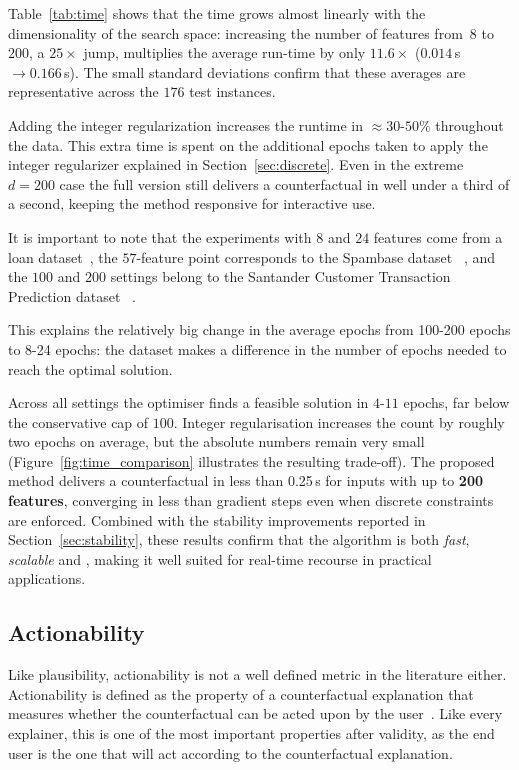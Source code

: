 \documentclass[12pt]{extarticle}
\numberwithin{equation}{section}
\begin{document}
Table~\ref{tab:time} shows that the time grows almost linearly with the dimensionality of the search space: increasing the number of features from~$8$ to~$200$, a $25\times$ jump, multiplies the average run-time by only $11.6\times$ ($0.014\,$s $\rightarrow 0.166\,$s). The small standard deviations confirm that these averages are representative across the $176$ test instances.

Adding the integer regularization increases the runtime in $\approx 30\text{-}50\%$ throughout the data. This extra time is spent on the additional epochs taken to apply the integer regularizer explained in Section~\ref{sec:discrete}. Even in the extreme $d=200$ case the full version still
delivers a counterfactual in well under a third of a second, keeping the
method responsive for interactive use.

It is important to note that the experiments with $8$ and $24$ features come from a loan dataset~\cite{kaggleLoan1}, the $57$-feature point corresponds to the Spambase dataset ~\cite{spambase}, and the $100$ and $200$ settings belong to the Santander Customer Transaction Prediction dataset ~\cite{santander}.  

This explains the relatively big change in the average epochs from 100-200 epochs to 8-24 epochs: the dataset makes a difference in the number of epochs needed to reach the optimal solution. 

Across all settings the optimiser finds a feasible solution in $4\text{-}11$ epochs, far below the conservative cap of $100$.  Integer regularisation increases the count by roughly two epochs on average, but the absolute numbers remain very small (Figure~\ref{fig:time_comparison} illustrates the resulting trade-off). The proposed method delivers a counterfactual in less than 0.25\,s for inputs with up to \textbf{200 features}, converging in less than gradient steps even when discrete constraints are enforced.  Combined with the stability improvements reported in Section~\ref{sec:stability}, these results confirm that the algorithm is both \emph{fast}, \emph{scalable} and , making it well suited for real-time recourse in practical applications.


\subsection{Actionability} \label{sec:actionability}
Like plausibility, actionability is not a well defined metric in the literature either. Actionability is defined as the property of a counterfactual explanation that measures whether the counterfactual can be acted upon by the user~\cite{guidotti2024counterfactual}. Like every explainer, this is one of the most important properties after validity, as the end user is the one that will act according to the counterfactual explanation. 
\end{document}
